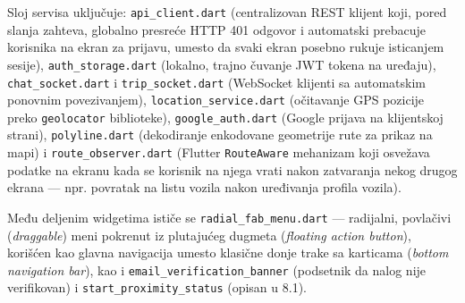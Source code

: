 Sloj servisa uključuje: \texttt{api\_client.dart} (centralizovan REST klijent koji, pored slanja zahteva, globalno presreće HTTP 401 odgovor i automatski prebacuje korisnika na ekran za prijavu, umesto da svaki ekran posebno rukuje isticanjem sesije), \texttt{auth\_storage.dart} (lokalno, trajno čuvanje JWT tokena na uređaju), \texttt{chat\_socket.dart} i \texttt{trip\_socket.dart} (WebSocket klijenti sa automatskim ponovnim povezivanjem), \texttt{location\_service.dart} (očitavanje GPS pozicije preko \texttt{geolocator} biblioteke), \texttt{google\_auth.dart} (Google prijava na klijentskoj strani), \texttt{polyline.dart} (dekodiranje enkodovane geometrije rute za prikaz na mapi) i \texttt{route\_observer.dart} (Flutter \texttt{RouteAware} mehanizam koji osvežava podatke na ekranu kada se korisnik na njega vrati nakon zatvaranja nekog drugog ekrana — npr. povratak na listu vozila nakon uređivanja profila vozila).

Među deljenim widgetima ističe se \texttt{radial\_fab\_menu.dart} — radijalni, povlačivi (\emph{draggable}) meni pokrenut iz plutajućeg dugmeta (\emph{floating action button}), korišćen kao glavna navigacija umesto klasične donje trake sa karticama (\emph{bottom navigation bar}), kao i \texttt{email\_verification\_banner} (podsetnik da nalog nije verifikovan) i \texttt{start\_proximity\_status} (opisan u 8.1).

\clearpage
